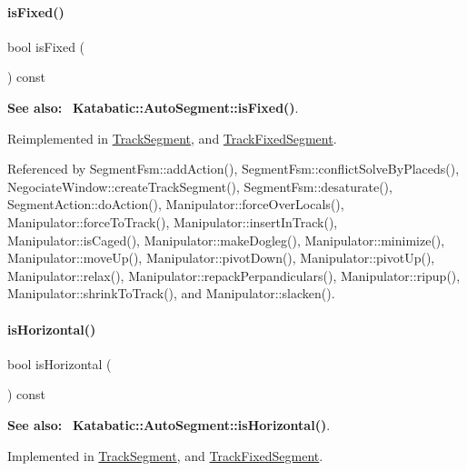 \paragraph{\texorpdfstring{is\+Fixed()}{isFixed()}}
{\footnotesize\ttfamily bool is\+Fixed (\begin{DoxyParamCaption}{ }\end{DoxyParamCaption}) const\hspace{0.3cm}{\ttfamily [virtual]}}

{\bfseries See also\+:}~ \textbf{ Katabatic\+::\+Auto\+Segment\+::is\+Fixed()}. 

Reimplemented in \hyperlink{classKite_1_1TrackSegment_afd7362b850709bed8b61c1aa22399f97}{Track\+Segment}, and \hyperlink{classKite_1_1TrackFixedSegment_afd7362b850709bed8b61c1aa22399f97}{Track\+Fixed\+Segment}.



Referenced by Segment\+Fsm\+::add\+Action(), Segment\+Fsm\+::conflict\+Solve\+By\+Placeds(), Negociate\+Window\+::create\+Track\+Segment(), Segment\+Fsm\+::desaturate(), Segment\+Action\+::do\+Action(), Manipulator\+::force\+Over\+Locals(), Manipulator\+::force\+To\+Track(), Manipulator\+::insert\+In\+Track(), Manipulator\+::is\+Caged(), Manipulator\+::make\+Dogleg(), Manipulator\+::minimize(), Manipulator\+::move\+Up(), Manipulator\+::pivot\+Down(), Manipulator\+::pivot\+Up(), Manipulator\+::relax(), Manipulator\+::repack\+Perpandiculars(), Manipulator\+::ripup(), Manipulator\+::shrink\+To\+Track(), and Manipulator\+::slacken().

\mbox{\label{classKite_1_1TrackElement_a9d3db1f8a5aca58f8f54d291faebf873}} 
\paragraph{\texorpdfstring{is\+Horizontal()}{isHorizontal()}}
{\footnotesize\ttfamily bool is\+Horizontal (\begin{DoxyParamCaption}{ }\end{DoxyParamCaption}) const\hspace{0.3cm}{\ttfamily [pure virtual]}}

{\bfseries See also\+:}~ \textbf{ Katabatic\+::\+Auto\+Segment\+::is\+Horizontal()}. 

Implemented in \hyperlink{classKite_1_1TrackSegment_a21b9cefd33ae22e4c2070ad441bdd30b}{Track\+Segment}, and \hyperlink{classKite_1_1TrackFixedSegment_a21b9cefd33ae22e4c2070ad441bdd30b}{Track\+Fixed\+Segment}.



